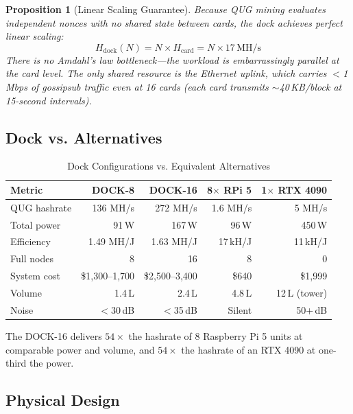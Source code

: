 \documentclass[11pt,a4paper]{article}
\newtheorem{proposition}[theorem]{Proposition}
\begin{document}
\begin{proposition}[Linear Scaling Guarantee]
Because QUG mining evaluates independent nonces with no shared state between cards, the dock achieves perfect linear scaling:
\begin{equation}
    H_{\text{dock}}(N) = N \times H_{\text{card}} = N \times 17\,\text{MH/s}
\end{equation}
There is no Amdahl's law bottleneck---the workload is embarrassingly parallel at the card level. The only shared resource is the Ethernet uplink, which carries $<$1\,Mbps of gossipsub traffic even at 16 cards (each card transmits $\sim$40\,KB/block at 15-second intervals).
\end{proposition}

\subsection{Dock vs. Alternatives}

\begin{table}[H]
\centering
\caption{Dock Configurations vs. Equivalent Alternatives}
\begin{tabular}{@{}lrrrr@{}}
\toprule
\textbf{Metric} & \textbf{DOCK-8} & \textbf{DOCK-16} & \textbf{8$\times$ RPi 5} & \textbf{1$\times$ RTX 4090} \\
\midrule
QUG hashrate & 136 MH/s & 272 MH/s & 1.6 MH/s & 5 MH/s \\
Total power & 91\,W & 167\,W & 96\,W & 450\,W \\
Efficiency & 1.49 MH/J & 1.63 MH/J & 17\,kH/J & 11\,kH/J \\
Full nodes & 8 & 16 & 8 & 0 \\
System cost & \$1,300--1,700 & \$2,500--3,400 & \$640 & \$1,999 \\
Volume & 1.4\,L & 2.4\,L & 4.8\,L & 12\,L (tower) \\
Noise & $<$30\,dB & $<$35\,dB & Silent & 50+\,dB \\
\bottomrule
\end{tabular}
\end{table}

The DOCK-16 delivers $54\times$ the hashrate of 8 Raspberry Pi 5 units at comparable power and volume, and $54\times$ the hashrate of an RTX 4090 at one-third the power.

\subsection{Physical Design}
\end{document}
